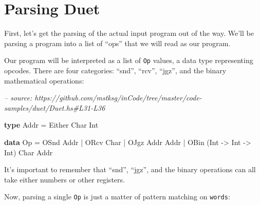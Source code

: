 \documentclass[]{article}
\newenvironment{Shaded}{}{}
\newcommand{\CommentTok}[1]{\textcolor[rgb]{0.38,0.63,0.69}{\textit{#1}}}
\newcommand{\DataTypeTok}[1]{\textcolor[rgb]{0.56,0.13,0.00}{#1}}
\newcommand{\FunctionTok}[1]{\textcolor[rgb]{0.02,0.16,0.49}{#1}}
\newcommand{\KeywordTok}[1]{\textcolor[rgb]{0.00,0.44,0.13}{\textbf{#1}}}
\newcommand{\NormalTok}[1]{#1}
\newcommand{\OtherTok}[1]{\textcolor[rgb]{0.00,0.44,0.13}{#1}}
\begin{document}
\hypertarget{parsing-duet}{%
\section{Parsing Duet}\label{parsing-duet}}

First, let's get the parsing of the actual input program out of the way. We'll
be parsing a program into a list of ``ops'' that we will read as our program.

Our program will be interpreted as a list of \texttt{Op} values, a data type
representing opcodes. There are four categories: ``snd'', ``rcv'', ``jgz'', and
the binary mathematical operations:

\begin{Shaded}
\begin{Highlighting}[]
\CommentTok{-- source: https://github.com/mstksg/inCode/tree/master/code-samples/duet/Duet.hs#L31-L36}

\KeywordTok{type} \DataTypeTok{Addr} \FunctionTok{=} \DataTypeTok{Either} \DataTypeTok{Char} \DataTypeTok{Int}

\KeywordTok{data} \DataTypeTok{Op} \FunctionTok{=} \DataTypeTok{OSnd} \DataTypeTok{Addr}
        \FunctionTok{|} \DataTypeTok{ORcv} \DataTypeTok{Char}
        \FunctionTok{|} \DataTypeTok{OJgz} \DataTypeTok{Addr} \DataTypeTok{Addr}
        \FunctionTok{|} \DataTypeTok{OBin}\NormalTok{ (}\DataTypeTok{Int} \OtherTok{->} \DataTypeTok{Int} \OtherTok{->} \DataTypeTok{Int}\NormalTok{) }\DataTypeTok{Char} \DataTypeTok{Addr}
\end{Highlighting}
\end{Shaded}

It's important to remember that ``snd'', ``jgz'', and the binary operations can
all take either numbers or other registers.

Now, parsing a single \texttt{Op} is just a matter of pattern matching on
\texttt{words}:
\end{document}
